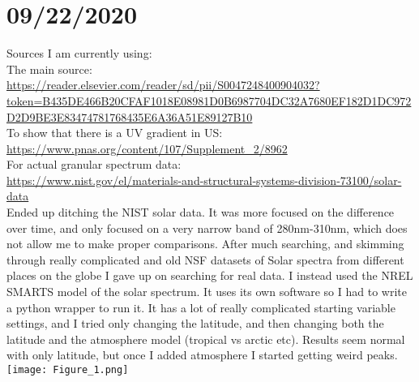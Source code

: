 \documentclass{article}
\begin{document}
    \section*{09/22/2020}
    Sources I am currently using:\\
    The main source:\\
    \url{https://reader.elsevier.com/reader/sd/pii/S0047248400904032?token=B435DE466B20CFAF1018E08981D0B6987704DC32A7680EF182D1DC972D2D9BE3E83474781768435E6A36A51E89127B10}\\
    To show that there is a UV gradient in US:\\
    \url{https://www.pnas.org/content/107/Supplement_2/8962}\\
    For actual granular spectrum data:\\
    \url{https://www.nist.gov/el/materials-and-structural-systems-division-73100/solar-data}\\
    Ended up ditching the NIST solar data. It was more focused on the difference over time, and only focused on a very narrow band of 280nm-310nm, which does not allow me to make proper comparisons. After much searching, and skimming through really complicated and old NSF datasets of Solar spectra from different places on the globe I gave up on searching for real data. I instead used the NREL SMARTS model of the solar spectrum. It uses its own software so I had to write a python wrapper to run it. It has a lot of really complicated starting variable settings, and I tried only changing the latitude, and then changing both the latitude and the atmosphere model (tropical vs arctic etc). Results seem normal with only latitude, but once I added atmosphere I started getting weird peaks.
    \texttt{[image: Figure\_1.png]}
\end{document}
